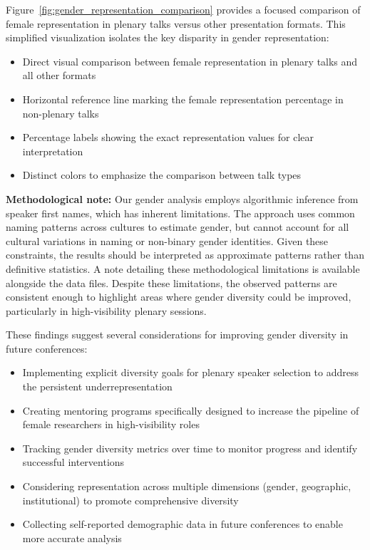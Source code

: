\documentclass[a4paper,11pt]{article}
\begin{document}
Figure~\ref{fig:gender_representation_comparison} provides a focused comparison of female representation in plenary talks versus other presentation formats. This simplified visualization isolates the key disparity in gender representation:

\begin{itemize}
    \item Direct visual comparison between female representation in plenary talks and all other formats
    \item Horizontal reference line marking the female representation percentage in non-plenary talks
    \item Percentage labels showing the exact representation values for clear interpretation
    \item Distinct colors to emphasize the comparison between talk types
\end{itemize}

\textbf{Methodological note:} Our gender analysis employs algorithmic inference from speaker first names, which has inherent limitations. The approach uses common naming patterns across cultures to estimate gender, but cannot account for all cultural variations in naming or non-binary gender identities. Given these constraints, the results should be interpreted as approximate patterns rather than definitive statistics. A note detailing these methodological limitations is available alongside the data files. Despite these limitations, the observed patterns are consistent enough to highlight areas where gender diversity could be improved, particularly in high-visibility plenary sessions.

These findings suggest several considerations for improving gender diversity in future conferences:

\begin{itemize}
    \item Implementing explicit diversity goals for plenary speaker selection to address the persistent underrepresentation
    \item Creating mentoring programs specifically designed to increase the pipeline of female researchers in high-visibility roles
    \item Tracking gender diversity metrics over time to monitor progress and identify successful interventions
    \item Considering representation across multiple dimensions (gender, geographic, institutional) to promote comprehensive diversity
    \item Collecting self-reported demographic data in future conferences to enable more accurate analysis
\end{itemize}
\end{document}

